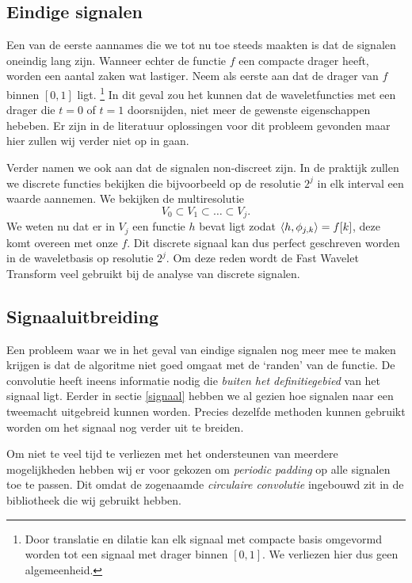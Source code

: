 \subsection{Eindige signalen}
Een van de eerste aannames die we tot nu toe steeds maakten is dat de signalen oneindig lang zijn. 
Wanneer echter de functie $f$ een compacte drager heeft, worden een aantal zaken wat lastiger. 
Neem als eerste aan dat de drager van $f$ binnen $[0,1]$ ligt.
\footnote{Door translatie en dilatie kan elk signaal met compacte basis omgevormd worden tot 
  een signaal met drager binnen $[0,1]$. We verliezen hier dus geen algemeenheid.} 
In dit geval zou het kunnen dat de waveletfuncties met een drager die $t=0$ of $t=1$ doorsnijden, 
niet meer de gewenste eigenschappen hebeben. 
Er zijn in de literatuur oplossingen voor dit probleem gevonden maar hier zullen wij verder niet op in gaan.

Verder namen we ook aan dat de signalen non-discreet zijn. In de praktijk zullen we discrete functies bekijken
die bijvoorbeeld op de resolutie $2^j$ in elk interval een waarde aannemen. We bekijken de multiresolutie
\[
V_0 \subset V_{1} \subset \ldots \subset V_{j}.
\]
We weten nu dat er in $V_j$ een functie $h$ bevat ligt zodat $\langle h , \phi_{j,k} \rangle = f[k]$, deze komt
overeen met onze $f$.
Dit discrete signaal kan dus perfect geschreven worden in de waveletbasis op resolutie $2^{j}$. 
Om deze reden wordt de Fast Wavelet Transform veel gebruikt bij de analyse van discrete signalen.

\subsection{Signaaluitbreiding}
Een probleem waar we in het geval van eindige signalen nog meer mee te maken krijgen is dat de 
algoritme niet goed omgaat met de `randen' van de functie. 
De convolutie heeft ineens informatie nodig die \emph{buiten het definitiegebied} van het signaal ligt. 
Eerder in sectie \ref{signaal} hebben we al gezien hoe signalen naar een tweemacht uitgebreid kunnen worden. 
Precies dezelfde methoden kunnen gebruikt worden om het signaal nog verder uit te breiden.

Om niet te veel tijd te verliezen met het ondersteunen van meerdere mogelijkheden hebben wij er voor gekozen om \emph{periodic padding} op alle signalen toe te passen. 
Dit omdat de zogenaamde \emph{circulaire convolutie} ingebouwd zit in de bibliotheek die wij gebruikt hebben.


